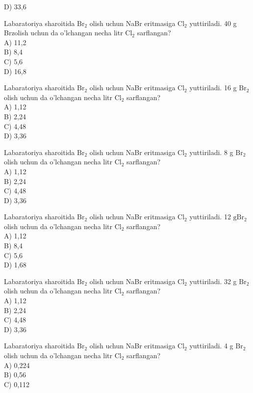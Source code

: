 D) 33,6
  \item Labaratoriya sharoitida $\mathrm{Br}_{2}$ olish uchun NaBr eritmasiga $\mathrm{Cl}_{2}$ yuttiriladi. 40 g Brzolish uchun da o'lchangan necha litr $\mathrm{Cl}_{2}$ sarflangan?\\
A) 11,2\\
B) 8,4\\
C) 5,6\\
D) 16,8
  \item Labaratoriya sharoitida $\mathrm{Br}_{2}$ olish uchun NaBr eritmasiga $\mathrm{Cl}_{2}$ yuttiriladi. 16 g $\mathrm{Br}_{2}$ olish uchun da o'lchangan necha litr $\mathrm{Cl}_{2}$ sarflangan?\\
A) 1,12\\
B) 2,24\\
C) 4,48\\
D) 3,36
  \item Labaratoriya sharoitida $\mathrm{Br}_{2}$ olish uchun NaBr eritmasiga $\mathrm{Cl}_{2}$ yuttiriladi. 8 g $\mathrm{Br}_{2}$ olish uchun da o'lchangan necha litr $\mathrm{Cl}_{2}$ sarflangan?\\
A) 1,12\\
B) 2,24\\
C) 4,48\\
D) 3,36
  \item Labaratoriya sharoitida $\mathrm{Br}_{2}$ olish uchun NaBr eritmasiga $\mathrm{Cl}_{2}$ yuttiriladi. 12 $\mathrm{g} \mathrm{Br}_{2}$ olish uchun da o'lchangan necha litr $\mathrm{Cl}_{2}$ sarflangan?\\
A) 1,12\\
B) 8,4\\
C) 5,6\\
D) 1,68
  \item Labaratoriya sharoitida $\mathrm{Br}_{2}$ olish uchun NaBr eritmasiga $\mathrm{Cl}_{2}$ yuttiriladi. 32 g $\mathrm{Br}_{2}$ olish uchun da o'lchangan necha litr $\mathrm{Cl}_{2}$ sarflangan?\\
A) 1,12\\
B) 2,24\\
C) 4,48\\
D) 3,36
  \item Labaratoriya sharoitida $\mathrm{Br}_{2}$ olish uchun NaBr eritmasiga $\mathrm{Cl}_{2}$ yuttiriladi. 4 g $\mathrm{Br}_{2}$ olish uchun da o'lchangan necha litr $\mathrm{Cl}_{2}$ sarflangan?\\
A) 0,224\\
B) 0,56\\
C) 0,112\\
